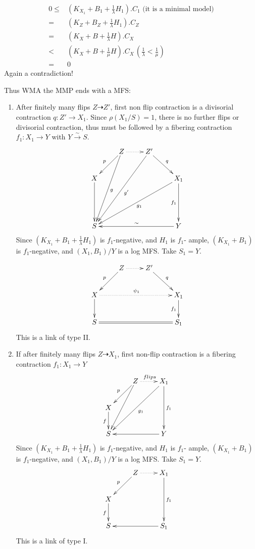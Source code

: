 \documentclass{article}
\begin{document}
\begin{enumerate}[(A)]
\begin{enumerate}[a)]
		\begin{equation*}
			\begin{aligned}
				0\leqslant& (K_{X_1}+B_1+\frac{1}{\lambda}H_1).C_1 \text{ (it is a minimal model)}\\
				=&(K_{Z}+B_{Z}+\frac{1}{\lambda}H_1).C_{Z}\\
				= &(K_X+B+\frac{1}{\lambda}H).C_X\\
				<&(K_{X}+B+\frac{1}{\mu}H).C_X  \,(\frac{1}{\lambda}<\frac{1}{\mu})\\
				=&0
			\end{aligned}
		\end{equation*} 
		Again  a contradiction!
	\end{enumerate}  
	Thus WMA the MMP ends with a MFS:
	\begin{enumerate}[1)]
		\item After finitely many flips $ Z\dashrightarrow Z' $, first non flip contraction is a divisorial contraction $ q:Z'\to X_1 $. Since $ \rho(X_1/S)=1 $, there is no further flips or divisorial contraction, thus must be followed by a fibering contraction $ f_1:X_1\to Y $ with $ Y\xrightarrow{\sim}S $.
		$$ \xymatrix{
			&Z\ar[lddd]^g\ar[ld]_p\ar@{.>}[r]&Z'\ar[dr]^{q}\ar[llddd]^{g'}&\\
			X\ar[dd]&&&X_1\ar[dd]_{f_1}\ar[ddlll]^{g_1}\\
			&&&\\
			S&&&Y\ar[lll]_{\sim}} $$
		Since $ (K_{X_1}+B_1+\frac{1}{\lambda}H_1) $ is $ f_1 $-negative, and $ H_1 $ is $ f_1 $- ample, $ (K_{X_1}+B_1) $ is $ f_1 $-negative, and $ (X_1,B_1)/Y $ is a log MFS.  Take $ S_1=Y $.
		
		$$ \xymatrix{
			&Z\ar[ld]_p\ar@{.>}[r]&Z'\ar[dr]^{q}&\\
			X\ar[d]\ar@{.>}[rrr]^{\psi_1}&&&X_1\ar[d]_{f_1}\\
			S\ar@{=}[rrr]&&&S_1} $$
		This is a link of type II.
		\item If after finitely many flips $ Z\dashrightarrow X_1 $, first non-flip contraction is a fibering contraction $ f_1:X_1\to Y  $ 
		$$ \xymatrix{
			&Z\ar[ld]_p\ar[ldd]\ar@{.>}[r]^{flips}&X_1\ar[lldd]^{g_1}\ar[dd]^{f_1}\\
			X\ar[d]_f&&\\
			S &&Y\ar[ll]}$$
		Since $ (K_{X_1}+B_1+\frac{1}{\lambda}H_1) $ is $ f_1 $-negative, and $ H_1 $ is $ f_1 $- ample, $ (K_{X_1}+B_1) $ is $ f_1 $-negative, and $ (X_1,B_1)/Y $ is a log MFS.  Take $ S_1=Y $.
		$$ \xymatrix{
			&Z\ar[ld]_p\ar@{.>}[r]&X_1\ar[dd]^{f_1}\\
			X\ar[d]_f&&\\
			S &&S_1\ar[ll]}$$
		This is a link of type I.
	\end{enumerate} 
\end{enumerate}
\end{document}
